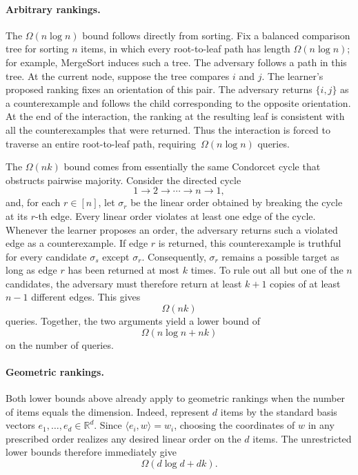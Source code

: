 \documentclass[11pt]{article}
\theoremstyle{definition}
\theoremstyle{remark}
\begin{document}
\paragraph{Arbitrary rankings.}
The $\Omega(n\log n)$ bound follows directly from sorting. Fix a balanced
comparison tree for sorting $n$ items, in which every root-to-leaf path has
length $\Omega(n\log n)$; for example, MergeSort induces such a tree. The
adversary follows a path in this tree. At the current node, suppose the tree
compares $i$ and $j$. The learner's proposed ranking fixes an orientation of
this pair. The adversary returns $\{i,j\}$ as a counterexample and follows
the child corresponding to the opposite orientation. At the end of the
interaction, the ranking at the resulting leaf is consistent with all the
counterexamples that were returned. Thus the interaction is forced to
traverse an entire root-to-leaf path, requiring~$\Omega(n\log n)$ queries.

The $\Omega(nk)$ bound comes from essentially the same Condorcet cycle that
obstructs pairwise majority. Consider the directed cycle
\[
    1\to2\to\cdots\to n\to1,
\]
and, for each $r\in[n]$, let $\sigma_r$ be the linear order obtained by
breaking the cycle at its $r$-th edge. Every linear order violates at least
one edge of the cycle. Whenever the learner proposes an order, the adversary
returns such a violated edge as a counterexample. If edge $r$ is returned,
this counterexample is truthful for every candidate $\sigma_s$ except
$\sigma_r$. Consequently, $\sigma_r$ remains a possible target as long as
edge $r$ has been returned at most $k$ times. To rule out all but one of the
$n$ candidates, the adversary must therefore return at least $k+1$ copies of
at least $n-1$ different edges. This gives
\[
    \Omega(nk)
\]
queries. Together, the two arguments yield a lower bound of
\[
    \Omega(n\log n+nk)
\]
on the number of queries.

\paragraph{Geometric rankings.}
Both lower bounds above already apply to geometric rankings when the number
of items equals the dimension. Indeed, represent $d$ items by the standard
basis vectors $e_1,\ldots,e_d\in\mathbb R^d$. Since
$\langle e_i,w\rangle=w_i$, choosing the coordinates of $w$ in any prescribed
order realizes any desired linear order on the $d$ items. The unrestricted
lower bounds therefore immediately give
\[
    \Omega(d\log d+dk).
\]
\end{document}
